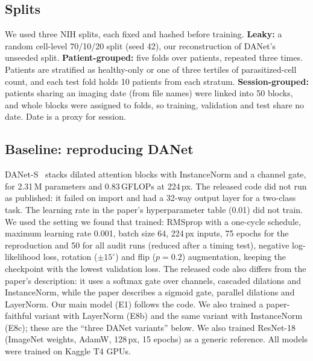 \documentclass[conference]{IEEEtran}
\begin{document}
\subsection{Splits}
We used three NIH splits, each fixed and hashed before training. \textbf{Leaky:} a random cell-level 70/10/20 split (seed 42), our reconstruction of DANet's unseeded split. \textbf{Patient-grouped:} five folds over patients, repeated three times. Patients are stratified as healthy-only or one of three tertiles of parasitized-cell count, and each test fold holds 10 patients from each stratum. \textbf{Session-grouped:} patients sharing an imaging date (from file names) were linked into 50 blocks, and whole blocks were assigned to folds, so training, validation and test share no date. Date is a proxy for session.

\subsection{Baseline: reproducing DANet}
DANet-S~\cite{ali2025danet} stacks dilated attention blocks with InstanceNorm and a channel gate, for 2.31\,M parameters and 0.83\,GFLOPs at 224\,px. The released code did not run as published: it failed on import and had a 32-way output layer for a two-class task. The learning rate in the paper's hyperparameter table (0.01) did not train. We used the setting we found that trained: RMSprop with a one-cycle schedule, maximum learning rate 0.001, batch size 64, 224\,px inputs, 75 epochs for the reproduction and 50 for all audit runs (reduced after a timing test), negative log-likelihood loss, rotation ($\pm15^\circ$) and flip ($p=0.2$) augmentation, keeping the checkpoint with the lowest validation loss. The released code also differs from the paper's description: it uses a softmax gate over channels, cascaded dilations and InstanceNorm, while the paper describes a sigmoid gate, parallel dilations and LayerNorm. Our main model (E1) follows the code. We also trained a paper-faithful variant with LayerNorm (E8b) and the same variant with InstanceNorm (E8c); these are the ``three DANet variants'' below. We also trained ResNet-18~\cite{he2016} (ImageNet weights, AdamW, 128\,px, 15 epochs) as a generic reference. All models were trained on Kaggle T4 GPUs.
\end{document}
